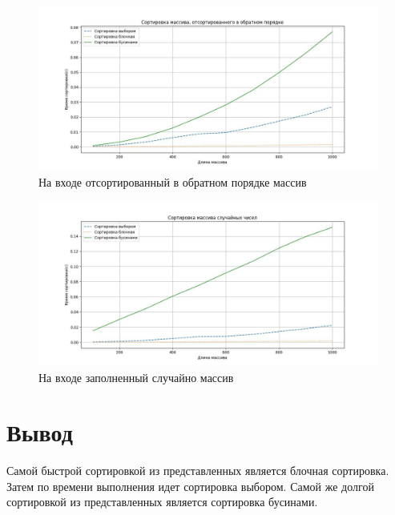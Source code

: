 \begin{figure}[H]
	\begin{center}
		\includegraphics[scale=0.5]{img/worst-type.jpg}
	\end{center}
	\captionsetup{justification=centering}
	\caption{На входе отсортированный в обратном порядке массив}
	\label{img:worst-type}
\end{figure}

\begin{figure}[H]
	\begin{center}
		\includegraphics[scale=0.5]{img/random-type.jpg}
	\end{center}
	\captionsetup{justification=centering}
	\caption{На входе заполненный случайно массив}
	\label{img:random-type}
\end{figure}

\section*{Вывод}

Самой быстрой сортировкой из представленных является блочная сортировка. Затем по времени выполнения идет сортировка выбором. Самой же долгой сортировкой из представленных является сортировка бусинами.
